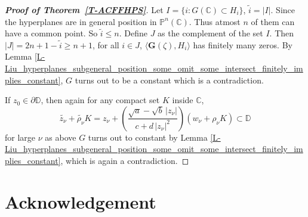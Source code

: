 \documentclass[11pt, reqno]{amsart}
\theoremstyle{definition}
\theoremstyle{remark}
\numberwithin{equation}{section}
\begin{document}
\begin{proof}[{\bf Proof of Theorem~\ref{T-ACFFHPS}}]
Let $I=\{i:G(\mathbb C)\subset H_i\}$, $\widetilde{i}=|I|$. Since the hyperplanes are in general position in $\mathbb P^n(\mathbb C)$.
Thus atmost $n$ of them can have a common point. So $\widetilde{i}\leq n$. Define $J$ as the complement of the set $I$. Then $|J|=2n+1-\widetilde{i}\geq n+1$, for all 
$i\in J$, $\langle \mathbf{G}(\zeta),H_i\rangle$ has finitely many zeros. By Lemma 
\ref{L-Liu_hyperplanes_subgeneral_position_some_omit_some_intersect_finitely_implies_constant}, $G$ turns out to be a constant which is a contradiction. \smallskip

If $z_0\in\partial\mathbb D$, then again for any compact set $K$ inside $\mathbb C$, $$\widetilde{z_{\nu}}+\widetilde{\rho_{\nu}}K=z_{\nu}+\left(\frac{\sqrt{a}-\sqrt{b}\,|z_{\nu}|}{c+d\,|z_{\nu}|^2}\right)(w_{\nu}+\rho_{\nu} K)\subset\mathbb D$$ for large $\nu$ as above $G$ turns out to constant by Lemma
\ref{L-Liu_hyperplanes_subgeneral_position_some_omit_some_intersect_finitely_implies_constant}, 
which is again a contradiction. 
\end{proof}
\section*{Acknowledgement}
\end{document}
